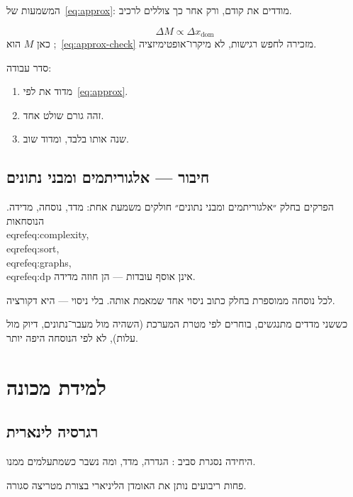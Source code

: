 המשמעות של~\eqref{eq:approx}: מודדים את  קודם, ורק אחר כך צוללים לרכיב.

\begin{equation}
\label{eq:approx-check}
\Delta M \propto \Delta x_{\mathrm{dom}}
\end{equation}
כאן $M$ הוא ;~\eqref{eq:approx-check} מזכירה לחפש רגישות, לא מיקרו־אופטימיזציה.

סדר עבודה:
\begin{enumerate}
\item[(\textbf{א})] מדוד את  לפי~\eqref{eq:approx}.
\item[(\textbf{ב})] זהה גורם שולט אחד.
\item[(\textbf{ג})] שנה אותו בלבד, ומדוד שוב.
\end{enumerate}


\chapter{חיבור — אלגוריתמים ומבני נתונים}
\label{ch:bridge-complexity}

הפרקים בחלק ״אלגוריתמים ומבני נתונים״ חולקים משמעת אחת: מדד, נוסחה, מדידה.
הנוסחאות \\eqref{eq:complexity}, \\eqref{eq:sort}, \\eqref{eq:graphs}, \\eqref{eq:dp} אינן אוסף עובדות — הן חוזה מדידה.

\begin{keybox}[frametitle={חוזה החלק}]
לכל נוסחה ממוספרת בחלק כתוב ניסוי אחד שמאמת אותה. בלי ניסוי — היא דקורציה.
\end{keybox}

כששני מדדים מתנגשים, בוחרים לפי מטרת המערכת (השהיה מול מעבר־נתונים, דיוק מול עלות),
לא לפי הנוסחה היפה יותר.

\part{למידת מכונה}

\chapter{רגרסיה לינארית}
\label{ch:linreg}

היחידה נסגרת סביב : הגדרה, מדד, ומה נשבר כשמתעלמים ממנו.

\begin{defbox}[frametitle={הגדרה — רגרסיה לינארית}]
פחות ריבועים נותן את האומדן הליניארי בצורת מטריצה סגורה.
\end{defbox}

